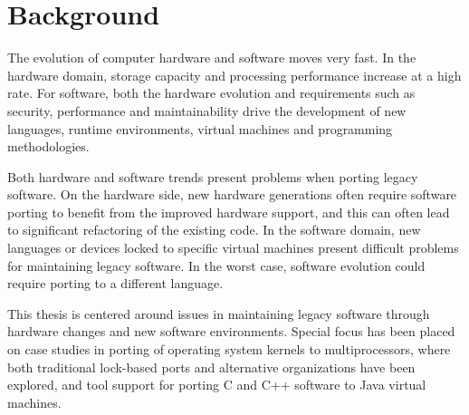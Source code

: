 


\section{Background}
The evolution of computer hardware and software moves very fast. In the
hardware domain, storage capacity and processing performance increase at a
high rate. For software, both the hardware evolution and requirements such as
security, performance and maintainability drive the development of new languages,
runtime environments, virtual machines and programming methodologies.

Both hardware and software trends present problems when porting legacy
software. On the hardware side, new hardware generations often require
software porting to benefit from the improved hardware support, and this can
often lead to significant refactoring of the existing code. In the software
domain, new languages or devices locked to specific virtual machines present
difficult problems for maintaining legacy software. In the worst case,
software evolution could require porting to a different language.

This thesis is centered around issues in maintaining legacy software through
hardware changes and new software environments. Special focus has been placed
on case studies in porting of operating system kernels to multiprocessors,
where both traditional lock-based ports and alternative organizations have
been explored, and tool support for porting C and C++ software to Java virtual
machines.



